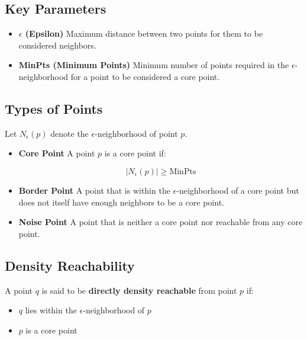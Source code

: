 \documentclass[10pt,a4paper]{article}
\begin{document}
	\subsection{Key Parameters}

	\begin{itemize}

		\item \textbf{$\epsilon$ (Epsilon)}
		Maximum distance between two points for them to be considered neighbors.

		\item \textbf{MinPts (Minimum Points)}
		Minimum number of points required in the $\epsilon$-neighborhood for a point to be considered a core point.

	\end{itemize}

	\subsection{Types of Points}

	Let $N_\epsilon(p)$ denote the $\epsilon$-neighborhood of point $p$.

	\begin{itemize}

		\item \textbf{Core Point}
		A point $p$ is a core point if:

		\[
		|N_\epsilon(p)| \geq \text{MinPts}
		\]

		\item \textbf{Border Point}
		A point that is within the $\epsilon$-neighborhood of a core point but does not itself have enough neighbors to be a core point.

		\item \textbf{Noise Point}
		A point that is neither a core point nor reachable from any core point.

	\end{itemize}

	\subsection{Density Reachability}

	A point $q$ is said to be \textbf{directly density reachable} from point $p$ if:

	\begin{itemize}
		\item $q$ lies within the $\epsilon$-neighborhood of $p$
		\item $p$ is a core point
	\end{itemize}
\end{document}
